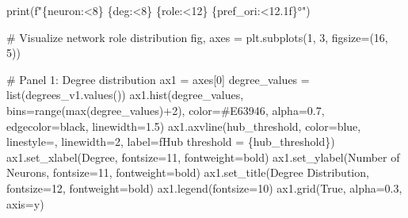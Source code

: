 \documentclass[
  11pt,
  letterpaper,
  oneside,
  openany]{book}
\newenvironment{Shaded}{\begin{snugshade}}{\end{snugshade}}
\newcommand{\BuiltInTok}[1]{\textcolor[rgb]{0.00,0.23,0.31}{#1}}
\newcommand{\CommentTok}[1]{\textcolor[rgb]{0.37,0.37,0.37}{#1}}
\newcommand{\DecValTok}[1]{\textcolor[rgb]{0.68,0.00,0.00}{#1}}
\newcommand{\FloatTok}[1]{\textcolor[rgb]{0.68,0.00,0.00}{#1}}
\newcommand{\NormalTok}[1]{\textcolor[rgb]{0.00,0.23,0.31}{#1}}
\newcommand{\OperatorTok}[1]{\textcolor[rgb]{0.37,0.37,0.37}{#1}}
\newcommand{\SpecialCharTok}[1]{\textcolor[rgb]{0.37,0.37,0.37}{#1}}
\newcommand{\SpecialStringTok}[1]{\textcolor[rgb]{0.13,0.47,0.30}{#1}}
\newcommand{\StringTok}[1]{\textcolor[rgb]{0.13,0.47,0.30}{#1}}
\newcommand{\VariableTok}[1]{\textcolor[rgb]{0.07,0.07,0.07}{#1}}
\begin{document}
\begin{Shaded}
\begin{Highlighting}[]
    \BuiltInTok{print}\NormalTok{(}\SpecialStringTok{f"}\SpecialCharTok{\{}\NormalTok{neuron}\SpecialCharTok{:\textless{}8\}}\SpecialStringTok{ }\SpecialCharTok{\{}\NormalTok{deg}\SpecialCharTok{:\textless{}8\}}\SpecialStringTok{ }\SpecialCharTok{\{}\NormalTok{role}\SpecialCharTok{:\textless{}12\}}\SpecialStringTok{ }\SpecialCharTok{\{}\NormalTok{pref\_ori}\SpecialCharTok{:\textless{}12.1f\}}\SpecialStringTok{°"}\NormalTok{)}

\CommentTok{\# Visualize network role distribution}
\NormalTok{fig, axes }\OperatorTok{=}\NormalTok{ plt.subplots(}\DecValTok{1}\NormalTok{, }\DecValTok{3}\NormalTok{, figsize}\OperatorTok{=}\NormalTok{(}\DecValTok{16}\NormalTok{, }\DecValTok{5}\NormalTok{))}

\CommentTok{\# Panel 1: Degree distribution}
\NormalTok{ax1 }\OperatorTok{=}\NormalTok{ axes[}\DecValTok{0}\NormalTok{]}
\NormalTok{degree\_values }\OperatorTok{=} \BuiltInTok{list}\NormalTok{(degrees\_v1.values())}
\NormalTok{ax1.hist(degree\_values, bins}\OperatorTok{=}\BuiltInTok{range}\NormalTok{(}\BuiltInTok{max}\NormalTok{(degree\_values)}\OperatorTok{+}\DecValTok{2}\NormalTok{),}
\NormalTok{         color}\OperatorTok{=}\StringTok{\textquotesingle{}\#E63946\textquotesingle{}}\NormalTok{, alpha}\OperatorTok{=}\FloatTok{0.7}\NormalTok{, edgecolor}\OperatorTok{=}\StringTok{\textquotesingle{}black\textquotesingle{}}\NormalTok{, linewidth}\OperatorTok{=}\FloatTok{1.5}\NormalTok{)}
\NormalTok{ax1.axvline(hub\_threshold, color}\OperatorTok{=}\StringTok{\textquotesingle{}blue\textquotesingle{}}\NormalTok{, linestyle}\OperatorTok{=}\StringTok{\textquotesingle{}{-}{-}\textquotesingle{}}\NormalTok{, linewidth}\OperatorTok{=}\DecValTok{2}\NormalTok{,}
\NormalTok{           label}\OperatorTok{=}\SpecialStringTok{f\textquotesingle{}Hub threshold = }\SpecialCharTok{\{}\NormalTok{hub\_threshold}\SpecialCharTok{\}}\SpecialStringTok{\textquotesingle{}}\NormalTok{)}
\NormalTok{ax1.set\_xlabel(}\StringTok{\textquotesingle{}Degree\textquotesingle{}}\NormalTok{, fontsize}\OperatorTok{=}\DecValTok{11}\NormalTok{, fontweight}\OperatorTok{=}\StringTok{\textquotesingle{}bold\textquotesingle{}}\NormalTok{)}
\NormalTok{ax1.set\_ylabel(}\StringTok{\textquotesingle{}Number of Neurons\textquotesingle{}}\NormalTok{, fontsize}\OperatorTok{=}\DecValTok{11}\NormalTok{, fontweight}\OperatorTok{=}\StringTok{\textquotesingle{}bold\textquotesingle{}}\NormalTok{)}
\NormalTok{ax1.set\_title(}\StringTok{\textquotesingle{}Degree Distribution\textquotesingle{}}\NormalTok{, fontsize}\OperatorTok{=}\DecValTok{12}\NormalTok{, fontweight}\OperatorTok{=}\StringTok{\textquotesingle{}bold\textquotesingle{}}\NormalTok{)}
\NormalTok{ax1.legend(fontsize}\OperatorTok{=}\DecValTok{10}\NormalTok{)}
\NormalTok{ax1.grid(}\VariableTok{True}\NormalTok{, alpha}\OperatorTok{=}\FloatTok{0.3}\NormalTok{, axis}\OperatorTok{=}\StringTok{\textquotesingle{}y\textquotesingle{}}\NormalTok{)}


\end{Highlighting}
\end{Shaded}
\end{document}
